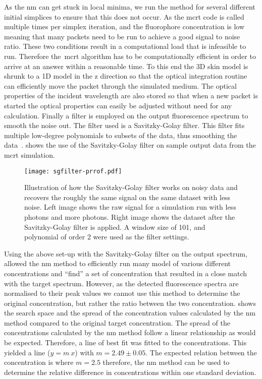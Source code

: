 As the \gls*{nm} can get stuck in local minima, we run the method for several different initial simplices to ensure that this does not occur.
As the \gls*{mcrt} code is called multiple times per simplex iteration, and the fluorophore concentration is low meaning that many packets need to be run to achieve a good signal to noise ratio.
These two conditions result in a computational load that is infeasible to run. 
Therefore the~\gls*{mcrt} algorithm has to be computationally efficient in order to arrive at an answer within a reasonable time.
To this end the 3D skin model is shrunk to a 1D model in the z direction so that the optical integration routine can efficiently move the packet through the simulated medium.
The optical properties of the incident wavelength are also stored so that when a new packet is started the optical properties can easily be adjusted without need for any calculation.
Finally a filter is employed on the output fluorescence spectrum to smooth the noise out.
The filter used is a Savitzky-Golay filter.
This filter fits multiple low-degree polynomials to subsets of the data, thus smoothing the data~\cite{press1990savitzky}. 
 shows the use of the Savitzky-Golay filter on sample output data from the \gls*{mcrt} simulation.

\begin{figure}[!htbp]
  \centering
  \texttt{[image: sgfilter-prrof.pdf]}
  \caption{Illustration of how the Savitzky-Golay filter works on noisy data and recovers the roughly the same signal on the same dataset with less noise. Left image shows the raw signal for a simulation run with less photons and more photons. Right image shows the dataset after the Savitzky-Golay filter is applied. A window size of 101, and polynomial of order 2 were used as the filter settings.}
  \label{fig:sgfilter}
\end{figure}


Using the above set-up with the Savitzky-Golay filter on the output spectrum, allowed the \gls*{nm} method to efficiently run many model of various different concentrations and ``find'' a set of concentration that resulted in a close match with the target spectrum.
However, as the detected fluorescence spectra are normalised to their peak values we cannot use this method to determine the original concentration, but rather the ratio between the two concentration.
 shows the search space and the spread of the concentration values calculated by the \gls*{nm} method compared to the original target concentration.
The spread of the concentrations calculated by the \gls*{nm} method follow a linear relationship as would be expected.
Therefore, a line of best fit was fitted to the concentrations.
This yielded a line ($y=m\ x$) with $m=2.49\pm0.05$.
The expected relation between the concentration is where $m =2.5$ therefore, the \gls*{nm} method can be used to determine the relative difference in concentrations within one standard deviation.


